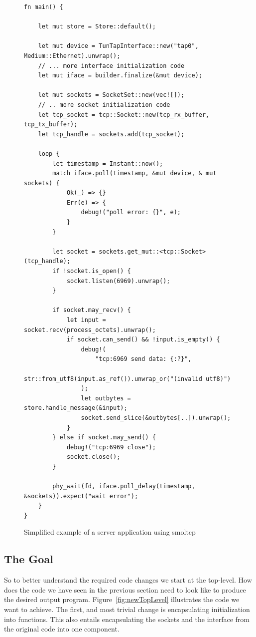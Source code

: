 \begin{figure}[H]
    \centering
    
\begin{verbatim}
fn main() {

    let mut store = Store::default();

    let mut device = TunTapInterface::new("tap0", Medium::Ethernet).unwrap();
    // ... more interface initialization code
    let mut iface = builder.finalize(&mut device);

    let mut sockets = SocketSet::new(vec![]);
    // .. more socket initialization code
    let tcp_socket = tcp::Socket::new(tcp_rx_buffer, tcp_tx_buffer);
    let tcp_handle = sockets.add(tcp_socket);

    loop {
        let timestamp = Instant::now();
        match iface.poll(timestamp, &mut device, & mut sockets) {
            Ok(_) => {}
            Err(e) => {
                debug!("poll error: {}", e);
            }
        }

        let socket = sockets.get_mut::<tcp::Socket>(tcp_handle);
        if !socket.is_open() {
            socket.listen(6969).unwrap();
        }

        if socket.may_recv() {
            let input = socket.recv(process_octets).unwrap();
            if socket.can_send() && !input.is_empty() {
                debug!(
                    "tcp:6969 send data: {:?}",
                    str::from_utf8(input.as_ref()).unwrap_or("(invalid utf8)")
                );
                let outbytes = store.handle_message(&input);
                socket.send_slice(&outbytes[..]).unwrap();
            }
        } else if socket.may_send() {
            debug!("tcp:6969 close");
            socket.close();
        }

        phy_wait(fd, iface.poll_delay(timestamp, &sockets)).expect("wait error");
    }
}
\end{verbatim}
    \caption{Simplified example of a server application using smoltcp}
    \label{fig:oldTopLevel}
\end{figure}


\subsection{The Goal}
So to better understand the required code changes we start at the top-level. How does the code we have seen in the previous section need to look like to produce the desired output program. Figure~\ref{fig:newTopLevel} illustrates the code we want to achieve. The first, and most trivial change is encapsulating initialization into  functions. This also entails encapsulating the sockets and the interface from the original code into one component.


